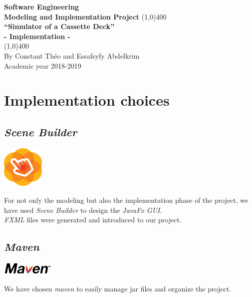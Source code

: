 \documentclass[11pt]{article}
\begin{document}
\begin{titlepage}
\begin{center}
\vspace*{1cm}
\Large{\textbf{Software Engineering}}\\
\Large{\textbf{Modeling and Implementation Project}}
\vfill
\line(1,0){400}\\[1mm]
\huge{\textbf{“Simulator of a Cassette Deck”}}\\[3mm]
\Large{\textbf{- Implementation -}}\\[1mm]
\line(1,0){400}\\
\vfill
By Constant Théo and Essafsyfy Abdelkrim\\
Academic year 2018-2019
\end{center}
\end{titlepage}

\tableofcontents
\thispagestyle{empty}
\clearpage
\setcounter{page}{1}

\section{Implementation choices}
\label{sec:implChoices}
\subsection{\textit{Scene Builder}}
\begin{center}
\includegraphics[width=2cm]{./img/SceneBuilder.png}\\
\end{center}
For not only the modeling but also the implementation phase of the project, we have used \textit{Scene Builder} to design the \textit{JavaFx GUI}.\\
\textit{FXML} files were generated and introduced to our project.
\subsection{\textit{Maven}}
\begin{center}
\includegraphics[width=2.5cm]{./img/maven.png}\\
\end{center}
We have chosen \textit{maven} to easily manage jar files and organize the project.
\end{document}
